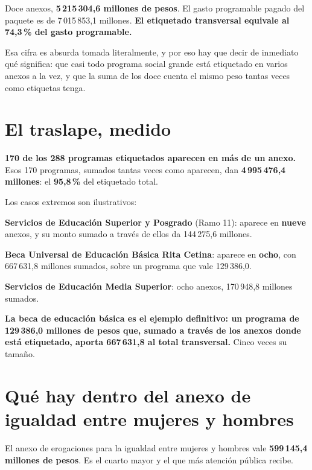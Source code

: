 Doce anexos, \textbf{5\,215\,304,6 millones de pesos}. El gasto programable pagado del paquete
es de 7\,015\,853,1 millones. \textbf{El etiquetado transversal equivale al 74,3\,\% del gasto
programable.}

Esa cifra es absurda tomada literalmente, y por eso hay que decir de inmediato qué significa:
que casi todo programa social grande está etiquetado en varios anexos a la vez, y que la suma
de los doce cuenta el mismo peso tantas veces como etiquetas tenga.

\section{El traslape, medido}

\textbf{170 de los 288 programas etiquetados aparecen en más de un anexo.} Esos 170 programas,
sumados tantas veces como aparecen, dan \textbf{4\,995\,476,4 millones}: el \textbf{95,8\,\%}
del etiquetado total.

Los casos extremos son ilustrativos:

\begin{list}{}{\setlength{\leftmargin}{1.4em}\setlength{\itemsep}{2pt}}
\item[$\bullet$] \textbf{Servicios de Educación Superior y Posgrado} (Ramo 11): aparece en
\textbf{nueve} anexos, y su monto sumado a través de ellos da 144\,275,6 millones.
\item[$\bullet$] \textbf{Beca Universal de Educación Básica Rita Cetina}: aparece en
\textbf{ocho}, con 667\,631,8 millones sumados, sobre un programa que vale 129\,386,0.
\item[$\bullet$] \textbf{Servicios de Educación Media Superior}: ocho anexos, 170\,948,8
millones sumados.
\end{list}

\textbf{La beca de educación básica es el ejemplo definitivo: un programa de 129\,386,0
millones de pesos que, sumado a través de los anexos donde está etiquetado, aporta 667\,631,8
al total transversal.} Cinco veces su tamaño.

\section{Qué hay dentro del anexo de igualdad entre mujeres y hombres}



El anexo de erogaciones para la igualdad entre mujeres y hombres vale \textbf{599\,145,4
millones de pesos}. Es el cuarto mayor y el que más atención pública recibe.

